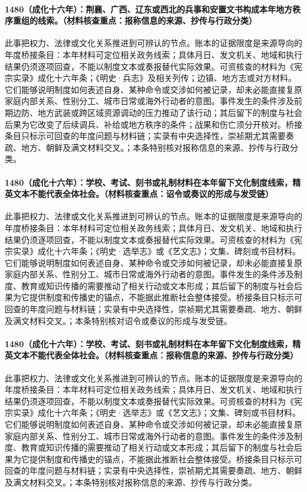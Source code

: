 \paragraph{1480（成化十六年）：荆襄、广西、辽东或西北的兵事和安置文书构成本年地方秩序重组的线索。（材料核查重点：报称信息的来源、抄传与行政分类）} 此事把权力、法律或文化关系推进到可辨认的节点。账本的证据限度是来源导向的年度桥接条目：本年材料可定位相关政务线索；具体月日、发文机关、地域和执行结果仍须逐项回查，不能以制度文本或奏报替代实际效果。可资核查的材料为《宪宗实录》成化十六年条；《明史·兵志》及相关列传；边镇、地方志或对方材料。它们能够说明制度如何表述自身、某种命令或交涉如何被记录，却未必能直接复原家庭内部关系、性别分工、城市日常或海外行动者的意图。事件发生的条件涉及前期边防、地方武装或跨区域资源调动的压力推动了该行动；其后留下的制度与社会后果为它改变了后续调兵、补给或地方秩序的条件；战果和伤亡须分开核对。桥接条目只标示可回查的年度问题与材料链；实录有中央选择性，崇祯期尤其需要奏疏、地方、朝鲜及满文材料交叉。；本条特别核对报称信息的来源、抄传与行政分类。

\paragraph{1480（成化十六年）：学校、考试、刻书或礼制材料在本年留下文化制度线索，精英文本不能代表全体社会。（材料核查重点：诏令或奏议的形成与发受链）} 此事把权力、法律或文化关系推进到可辨认的节点。账本的证据限度是来源导向的年度桥接条目：本年材料可定位相关政务线索；具体月日、发文机关、地域和执行结果仍须逐项回查，不能以制度文本或奏报替代实际效果。可资核查的材料为《宪宗实录》成化十六年条；《明史·选举志》或《艺文志》；文集、碑刻或书目材料。它们能够说明制度如何表述自身、某种命令或交涉如何被记录，却未必能直接复原家庭内部关系、性别分工、城市日常或海外行动者的意图。事件发生的条件涉及制度、教育或知识传播的需要推动了相关行动或文本形成；其后留下的制度与社会后果为它提供制度和传播史的锚点，不能据此推断社会整体接受。桥接条目只标示可回查的年度问题与材料链；实录有中央选择性，崇祯期尤其需要奏疏、地方、朝鲜及满文材料交叉。；本条特别核对诏令或奏议的形成与发受链。

\paragraph{1480（成化十六年）：学校、考试、刻书或礼制材料在本年留下文化制度线索，精英文本不能代表全体社会。（材料核查重点：报称信息的来源、抄传与行政分类）} 此事把权力、法律或文化关系推进到可辨认的节点。账本的证据限度是来源导向的年度桥接条目：本年材料可定位相关政务线索；具体月日、发文机关、地域和执行结果仍须逐项回查，不能以制度文本或奏报替代实际效果。可资核查的材料为《宪宗实录》成化十六年条；《明史·选举志》或《艺文志》；文集、碑刻或书目材料。它们能够说明制度如何表述自身、某种命令或交涉如何被记录，却未必能直接复原家庭内部关系、性别分工、城市日常或海外行动者的意图。事件发生的条件涉及制度、教育或知识传播的需要推动了相关行动或文本形成；其后留下的制度与社会后果为它提供制度和传播史的锚点，不能据此推断社会整体接受。桥接条目只标示可回查的年度问题与材料链；实录有中央选择性，崇祯期尤其需要奏疏、地方、朝鲜及满文材料交叉。；本条特别核对报称信息的来源、抄传与行政分类。

